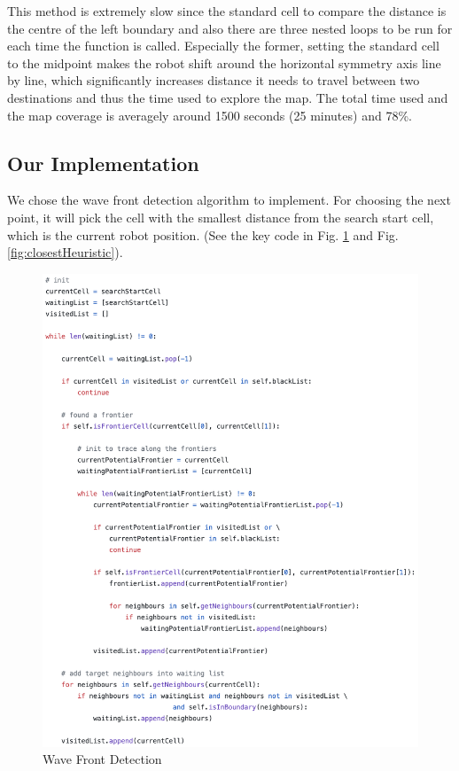 \documentclass{article}
\begin{document}
This method is extremely slow since the standard cell to compare the distance is the centre of the left boundary and also there are three nested loops to be run for each time the function is called. Especially the former, setting the standard cell to the midpoint makes the robot shift around the horizontal symmetry axis line by line, which significantly increases distance it needs to travel between two destinations and thus the time used to explore the map. The total time used and the map coverage is averagely around 1500 seconds (25 minutes) and 78\%. 

\subsection {Our Implementation}
We chose the wave front detection algorithm to implement. For choosing the next point, it will pick the cell with the smallest distance from the search start cell, which is the current robot position. (See the key code in Fig. \ref{fig:waveFrontDetection} and Fig. \ref{fig:closestHeuristic}). 

\begin{figure}[ht]
\centering
\includegraphics[scale=0.5]{graphs/part2/2-3/WaveFrontDetection.png}
\caption{Wave Front Detection}
\label{fig:waveFrontDetection}
\end{figure}
\end{document}
